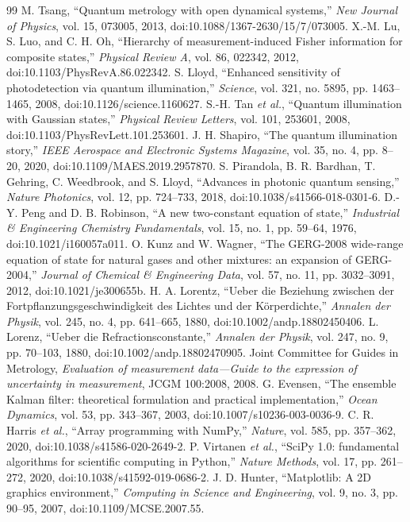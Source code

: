\documentclass[a4paper,11pt]{article}
\numberwithin{equation}{section}
\begin{document}
\begin{thebibliography}{99}
 M. Tsang, ``Quantum metrology with open dynamical systems,'' \emph{New Journal of Physics}, vol. 15, 073005, 2013, doi:10.1088/1367-2630/15/7/073005.
 X.-M. Lu, S. Luo, and C. H. Oh, ``Hierarchy of measurement-induced Fisher information for composite states,'' \emph{Physical Review A}, vol. 86, 022342, 2012, doi:10.1103/PhysRevA.86.022342.
 S. Lloyd, ``Enhanced sensitivity of photodetection via quantum illumination,'' \emph{Science}, vol. 321, no. 5895, pp. 1463--1465, 2008, doi:10.1126/science.1160627.
 S.-H. Tan \emph{et al.}, ``Quantum illumination with Gaussian states,'' \emph{Physical Review Letters}, vol. 101, 253601, 2008, doi:10.1103/PhysRevLett.101.253601.
 J. H. Shapiro, ``The quantum illumination story,'' \emph{IEEE Aerospace and Electronic Systems Magazine}, vol. 35, no. 4, pp. 8--20, 2020, doi:10.1109/MAES.2019.2957870.
 S. Pirandola, B. R. Bardhan, T. Gehring, C. Weedbrook, and S. Lloyd, ``Advances in photonic quantum sensing,'' \emph{Nature Photonics}, vol. 12, pp. 724--733, 2018, doi:10.1038/s41566-018-0301-6.
 D.-Y. Peng and D. B. Robinson, ``A new two-constant equation of state,'' \emph{Industrial \& Engineering Chemistry Fundamentals}, vol. 15, no. 1, pp. 59--64, 1976, doi:10.1021/i160057a011.
 O. Kunz and W. Wagner, ``The GERG-2008 wide-range equation of state for natural gases and other mixtures: an expansion of GERG-2004,'' \emph{Journal of Chemical \& Engineering Data}, vol. 57, no. 11, pp. 3032--3091, 2012, doi:10.1021/je300655b.
 H. A. Lorentz, ``Ueber die Beziehung zwischen der Fortpflanzungsgeschwindigkeit des Lichtes und der K\"orperdichte,'' \emph{Annalen der Physik}, vol. 245, no. 4, pp. 641--665, 1880, doi:10.1002/andp.18802450406.
 L. Lorenz, ``Ueber die Refractionsconstante,'' \emph{Annalen der Physik}, vol. 247, no. 9, pp. 70--103, 1880, doi:10.1002/andp.18802470905.
 Joint Committee for Guides in Metrology, \emph{Evaluation of measurement data---Guide to the expression of uncertainty in measurement}, JCGM 100:2008, 2008.
 G. Evensen, ``The ensemble Kalman filter: theoretical formulation and practical implementation,'' \emph{Ocean Dynamics}, vol. 53, pp. 343--367, 2003, doi:10.1007/s10236-003-0036-9.
 C. R. Harris \emph{et al.}, ``Array programming with NumPy,'' \emph{Nature}, vol. 585, pp. 357--362, 2020, doi:10.1038/s41586-020-2649-2.
 P. Virtanen \emph{et al.}, ``SciPy 1.0: fundamental algorithms for scientific computing in Python,'' \emph{Nature Methods}, vol. 17, pp. 261--272, 2020, doi:10.1038/s41592-019-0686-2.
 J. D. Hunter, ``Matplotlib: A 2D graphics environment,'' \emph{Computing in Science and Engineering}, vol. 9, no. 3, pp. 90--95, 2007, doi:10.1109/MCSE.2007.55.
\end{thebibliography}
\end{document}
